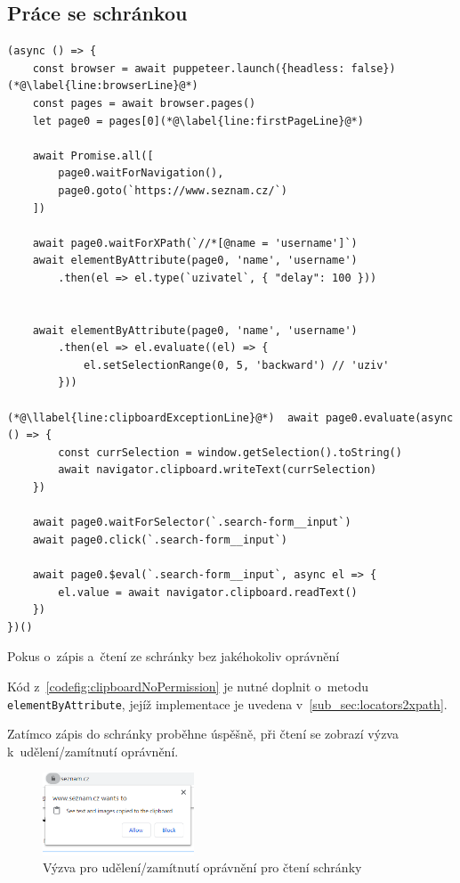 \documentclass[12pt, a4paper, twoside]{article}
\newcommand{\codefigureSpacing}{1.2}
\begin{document}
	\subsection{Práce se schránkou}
	\label{sub_sec:accessClipboardWithoutPermission}
	\begin{codefigure}[H]
		\renewcommand\baselinestretch{\codefigureSpacing}
		\begin{lstlisting}[style=MyJavaScript]
(async () => {
	const browser = await puppeteer.launch({headless: false})(*@\label{line:browserLine}@*)
	const pages = await browser.pages()
	let page0 = pages[0](*@\label{line:firstPageLine}@*)
	
	await Promise.all([
		page0.waitForNavigation(),
		page0.goto(`https://www.seznam.cz/`)
	])
	
	await page0.waitForXPath(`//*[@name = 'username']`)
	await elementByAttribute(page0, 'name', 'username')
		.then(el => el.type(`uzivatel`, { "delay": 100 }))
	
	
	await elementByAttribute(page0, 'name', 'username')
		.then(el => el.evaluate((el) => {
			el.setSelectionRange(0, 5, 'backward') // 'uziv'
		}))
	
(*@\llabel{line:clipboardExceptionLine}@*)	await page0.evaluate(async () => {
		const currSelection = window.getSelection().toString()
		await navigator.clipboard.writeText(currSelection)
	})
	
	await page0.waitForSelector(`.search-form__input`)
	await page0.click(`.search-form__input`)
	
	await page0.$eval(`.search-form__input`, async el => {
		el.value = await navigator.clipboard.readText()
	})
})()
		\end{lstlisting}
	\caption{Pokus o~zápis a~čtení ze schránky bez jakéhokoliv oprávnění}
	\label{codefig:clipboardNoPermission}
	\end{codefigure}
	Kód z~\cref{codefig:clipboardNoPermission} je nutné doplnit o~metodu \texttt{elementByAttribute}, jejíž implementace je uvedena v~\ref{sub_sec:locators2xpath}.
	
	\newpage
	Zatímco zápis do schránky proběhne úspěšně, při čtení se zobrazí výzva k~udělení/zamítnutí oprávnění.	
	\begin{figure}[H]
		\centering
		\includegraphics[width=0.4\textwidth]{clipboardReadPermission.png}
		\caption{Výzva pro udělení/zamítnutí oprávnění pro čtení schránky}
	\end{figure}
\end{document}
